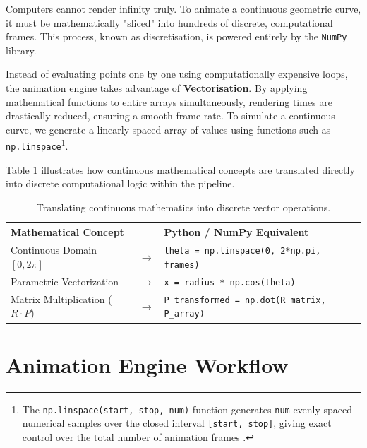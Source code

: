 \documentclass[12pt, a4paper]{report}
\begin{document}
Computers cannot render infinity truly. To animate a continuous geometric curve, it must be mathematically "sliced" into hundreds of discrete, computational frames. This process, known as discretisation, is powered entirely by the \texttt{NumPy} library.

Instead of evaluating points one by one using computationally expensive loops, the animation engine takes advantage of \textbf{Vectorisation}. By applying mathematical functions to entire arrays simultaneously, rendering times are drastically reduced, ensuring a smooth frame rate. To simulate a continuous curve, we generate a linearly spaced array of values using functions such as \texttt{np.linspace}\footnote{The \texttt{np.linspace(start, stop, num)} function generates \texttt{num} evenly spaced numerical samples over the closed interval \texttt{[start, stop]}, giving exact control over the total number of animation frames \cite{numpy_docs}.}.

Table \ref{tab:discretization} illustrates how continuous mathematical concepts are translated directly into discrete computational logic within the pipeline.

\vspace{0.4cm}
\begin{table}[htbp]
    \centering
    \renewcommand{\arraystretch}{1.6}
    \begin{tabular}{@{} p{4.5cm} c p{8cm} @{}}
        \toprule
        \textbf{Mathematical Concept} & & \textbf{Python / NumPy Equivalent} \\
        \midrule
        Continuous Domain $[0, 2\pi]$ & $\rightarrow$ & \texttt{theta = np.linspace(0, 2*np.pi, frames)} \\
        Parametric Vectorization & $\rightarrow$ & \texttt{x = radius * np.cos(theta)} \\
        Matrix Multiplication ($R \cdot P$) & $\rightarrow$ & \texttt{P\_transformed = np.dot(R\_matrix, P\_array)} \\
        \bottomrule
    \end{tabular}
    \caption{Translating continuous mathematics into discrete vector operations.}
    \label{tab:discretization}
\end{table}
\vspace{0.4cm}


\section{Animation Engine Workflow}
\end{document}
